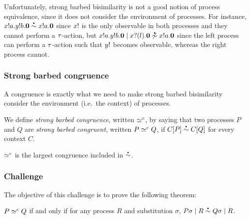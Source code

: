Unfortunately, strong barbed bisimilarity is not a good notion of
process equivalence, since it does not consider the environment of
processes.  For instance,
\( \sbbisim{\Pout{x}{a}{\Pout{y}{b}{\Pend}}}{\Pout{x}{a}{\Pend}} \)
since \( x! \) is the only observable in both processes and
they cannot perform a \( \tau \)-action, but
\(
\nsbbisim{\Ppar{\Pout{x}{a}{\Pout{y}{b}{\Pend}}}{\Pin{x}{l}{\Pend}}}{\Pout{x}{a}{\Pend}}
\) since the left process can perform a \( \tau \)-action such that
\( y! \) becomes observable, whereas the right process cannot.





\subsubsection{Strong barbed congruence}
A congruence is exactly what we need to make strong barbed bisimilarity consider the environment (i.e.\ the context) of processes.

We define \emph{strong barbed congruence}, written \( \simeq^c \), by saying that two processes \( P \) and \( Q \) are \emph{strong barbed congruent}, written \( P \simeq^c Q \), if \( \sbbisim{\applyctx{C}{P}}{\applyctx{C}{Q}} \) for every context \( C \).

\begin{lemma}
  \( \simeq^c \) is the largest congruence included in \( \sbbisim{}{} \).
\end{lemma}

\subsubsection{Challenge}
The objective of this challenge is to prove the following theorem:
\begin{theorem}
  \( P \simeq^c Q \) if and only if for any process \( R \) and substitution \( \sigma \), \( \sbbisim{\Ppar{\applysubst{\sigma}{P}}{R}}{\Ppar{\applysubst{\sigma}{Q}}{R}} \).
\end{theorem}
